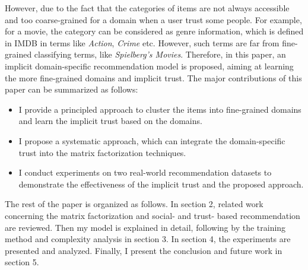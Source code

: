 However, due to the fact that the categories of items are not always accessible and too coarse-grained for a domain when a user trust some people. For example, for a movie, the category can be considered as genre information, which is defined in IMDB in terms like \emph{Action}, \emph{Crime} etc. However, such terms are far from fine-grained classifying terms, like \emph{Spielberg's Movies}. Therefore, in this paper, an implicit domain-specific recommendation model is proposed, aiming at learning the more fine-grained domains and implicit trust. The major contributions of this paper can be summarized as follows:
\begin{itemize}
	\item I provide a principled approach to cluster the items into fine-grained domains and learn the implicit trust based on the domains.
	\item I propose a systematic approach, which can integrate the domain-specific trust into the matrix factorization techniques.
	\item I conduct experiments on two real-world recommendation datasets to demonstrate the effectiveness of the implicit trust and the proposed approach.
\end{itemize}

The rest of the paper is organized as follows. In section 2, related work concerning the matrix factorization and social- and trust- based recommendation are reviewed. Then my model is explained in detail, following by the training method and complexity analysis in section 3. In section 4, the experiments are presented and analyzed. Finally, I present the conclusion and future work in section 5.


